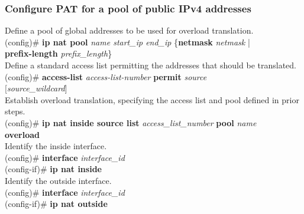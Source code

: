 \subsubsection*{Configure PAT for a pool of public IPv4 addresses}
\textrm{Define a pool of global addresses to be used for overload translation.}\\
(config)\# \textbf{ip nat pool} \textit{name start\_ip end\_ip} \{\textbf{netmask} \textit{netmask} | \\\textbf{prefix-length} \textit{prefix\_length}\}\vspace{11pt}\\
\textrm{Define a standard access list permitting the addresses that should be translated.}\\
(config)\# \textbf{access-list} \textit{access-list-number} \textbf{permit} \textit{source} \\{[\textit{source\_wildcard}]}\vspace{11pt}\\
\textrm{Establish overload translation, specifying the access list and pool defined in prior steps.}\\
(config)\# \textbf{ip nat inside source list} \textit{access\_list\_number} \textbf{pool} \textit{name} \\\textbf{overload}\vspace{11pt}\\
\textrm{Identify the inside interface.}\\
(config)\# \textbf{interface} \textit{interface\_id}\\
(config-if)\# \textbf{ip nat inside}\vspace{11pt}\\
\textrm{Identify the outside interface.}\\
(config)\# \textbf{interface} \textit{interface\_id}\\
(config-if)\# \textbf{ip nat outside}